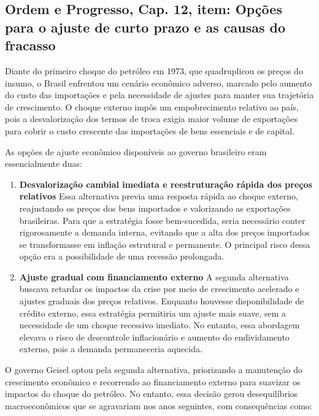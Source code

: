 \documentclass[a4paper,12pt]{article}[abntex2]
\begin{document}
\subsection{\textbf{Ordem e Progresso, Cap. 12, item: Opções para o ajuste de curto prazo e as causas do fracasso}}

Diante do primeiro choque do petróleo em 1973, que quadruplicou os preços do insumo, o Brasil enfrentou um cenário econômico adverso, marcado pelo aumento do custo das importações e pela necessidade de ajustes para manter sua trajetória de crescimento. O choque externo impôs um empobrecimento relativo ao país, pois a desvalorização dos termos de troca exigia maior volume de exportações para cobrir o custo crescente das importações de bens essenciais e de capital.

As opções de ajuste econômico disponíveis ao governo brasileiro eram essencialmente duas:

\begin{enumerate}
    \item \textbf{Desvalorização cambial imediata e reestruturação rápida dos preços relativos}  
    Essa alternativa previa uma resposta rápida ao choque externo, reajustando os preços dos bens importados e valorizando as exportações brasileiras. Para que a estratégia fosse bem-sucedida, seria necessário conter rigorosamente a demanda interna, evitando que a alta dos preços importados se transformasse em inflação estrutural e permanente. O principal risco dessa opção era a possibilidade de uma recessão prolongada.

    \item \textbf{Ajuste gradual com financiamento externo}  
    A segunda alternativa buscava retardar os impactos da crise por meio de crescimento acelerado e ajustes graduais dos preços relativos. Enquanto houvesse disponibilidade de crédito externo, essa estratégia permitiria um ajuste mais suave, sem a necessidade de um choque recessivo imediato. No entanto, essa abordagem elevava o risco de descontrole inflacionário e aumento do endividamento externo, pois a demanda permaneceria aquecida.
\end{enumerate}

O governo Geisel optou pela segunda alternativa, priorizando a manutenção do crescimento econômico e recorrendo ao financiamento externo para suavizar os impactos do choque do petróleo. No entanto, essa decisão gerou desequilíbrios macroeconômicos que se agravariam nos anos seguintes, com consequências como:
\end{document}
